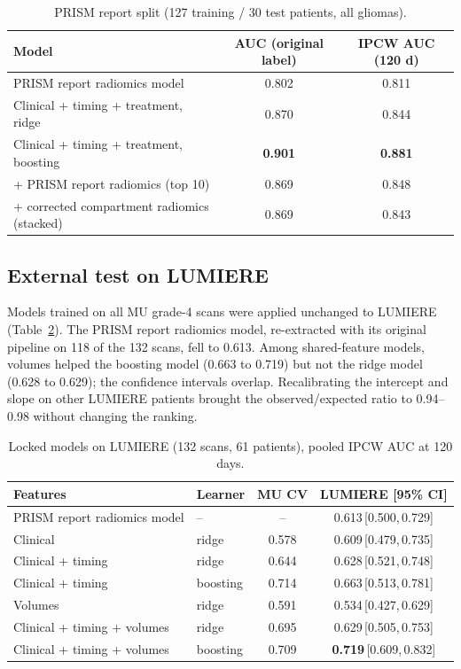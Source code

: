 \documentclass[11pt,a4paper]{article}
\newcommand{\ci}[2]{\,[#1,\,#2]}
\begin{document}
\begin{table}[h]
\centering
\caption{PRISM report split (127 training / 30 test patients, all gliomas).}
\label{tab:split}
\small
\begin{tabular}{lcc}
\toprule
Model & AUC (original label) & IPCW AUC (120 d) \\
\midrule
PRISM report radiomics model & 0.802 & 0.811 \\
Clinical + timing + treatment, ridge & 0.870 & 0.844 \\
Clinical + timing + treatment, boosting & \textbf{0.901} & \textbf{0.881} \\
\quad + PRISM report radiomics (top 10) & 0.869 & 0.848 \\
\quad + corrected compartment radiomics (stacked) & 0.869 & 0.843 \\
\bottomrule
\end{tabular}
\end{table}

\subsection{External test on LUMIERE}
Models trained on all MU grade-4 scans were applied unchanged to LUMIERE (Table~\ref{tab:ext}). The PRISM report
radiomics model, re-extracted with its original pipeline on 118 of the 132 scans, fell to 0.613. Among shared-feature
models, volumes helped the boosting model (0.663 to 0.719) but not the ridge model (0.628 to 0.629); the confidence
intervals overlap. Recalibrating the intercept and slope on other LUMIERE patients brought the observed/expected ratio
to 0.94--0.98 without changing the ranking.

\begin{table}[h]
\centering
\caption{Locked models on LUMIERE (132 scans, 61 patients), pooled IPCW AUC at 120 days.}
\label{tab:ext}
\small
\begin{tabular}{llcc}
\toprule
Features & Learner & MU CV & LUMIERE [95\% CI] \\
\midrule
PRISM report radiomics model & -- & -- & 0.613\ci{0.500}{0.729} \\
Clinical & ridge & 0.578 & 0.609\ci{0.479}{0.735} \\
Clinical + timing & ridge & 0.644 & 0.628\ci{0.521}{0.748} \\
Clinical + timing & boosting & 0.714 & 0.663\ci{0.513}{0.781} \\
Volumes & ridge & 0.591 & 0.534\ci{0.427}{0.629} \\
Clinical + timing + volumes & ridge & 0.695 & 0.629\ci{0.505}{0.753} \\
Clinical + timing + volumes & boosting & 0.709 & \textbf{0.719}\ci{0.609}{0.832} \\
\bottomrule
\end{tabular}
\end{table}
\end{document}
